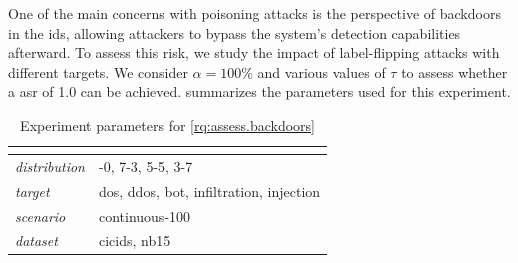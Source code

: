 One of the main concerns with poisoning attacks is the perspective of backdoors in the \gls{ids}, allowing attackers to bypass the system's detection capabilities afterward.
To assess this risk, we study the impact of label-flipping attacks with different targets.
We consider $\alpha=100\%$ and various values of $\tau$ to assess whether a \gls{asr} of 1.0 can be achieved.
 summarizes the parameters used for this experiment.

\begin{table}
  \caption{Experiment parameters for \ref{rq:assess.backdoors}}
  \label{tbl:asssess.backdoors}
  \small
  \begin{tabular}{>{\ttfamily\itshape}p{} >{\ttfamily}p{}}
    \toprule
    \multicolumn{2}{>{\bfseries}p{.9\columnwidth}}{\rqbackdoor} \\
    \midrule
    distribution & 10-0, 7-3, 5-5, 3-7 \\
    target & dos, ddos, bot, infiltration, injection \\
    scenario & continuous-100 \\
    dataset & cicids, nb15 \\
    \bottomrule
  \end{tabular}
\end{table}

